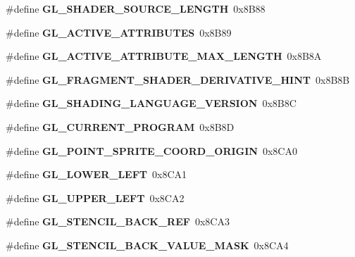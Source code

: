 \begin{DoxyCompactItemize}
\item 
\#define {\bfseries G\+L\+\_\+\+S\+H\+A\+D\+E\+R\+\_\+\+S\+O\+U\+R\+C\+E\+\_\+\+L\+E\+N\+G\+T\+H}~0x8\+B88\label{_s_d_l__opengl_8h_a7b395fbd7051f340da13f8777b24fc5f}

\item 
\#define {\bfseries G\+L\+\_\+\+A\+C\+T\+I\+V\+E\+\_\+\+A\+T\+T\+R\+I\+B\+U\+T\+E\+S}~0x8\+B89\label{_s_d_l__opengl_8h_aa7c727896f0964d71eacb6ccb57ad328}

\item 
\#define {\bfseries G\+L\+\_\+\+A\+C\+T\+I\+V\+E\+\_\+\+A\+T\+T\+R\+I\+B\+U\+T\+E\+\_\+\+M\+A\+X\+\_\+\+L\+E\+N\+G\+T\+H}~0x8\+B8\+A\label{_s_d_l__opengl_8h_ac70225d2da03ecc6671e9e7967fa6f60}

\item 
\#define {\bfseries G\+L\+\_\+\+F\+R\+A\+G\+M\+E\+N\+T\+\_\+\+S\+H\+A\+D\+E\+R\+\_\+\+D\+E\+R\+I\+V\+A\+T\+I\+V\+E\+\_\+\+H\+I\+N\+T}~0x8\+B8\+B\label{_s_d_l__opengl_8h_a8afd2d52d8a440f4b8b05d6284308710}

\item 
\#define {\bfseries G\+L\+\_\+\+S\+H\+A\+D\+I\+N\+G\+\_\+\+L\+A\+N\+G\+U\+A\+G\+E\+\_\+\+V\+E\+R\+S\+I\+O\+N}~0x8\+B8\+C\label{_s_d_l__opengl_8h_acd91f154544ab6a152e97adcb742c891}

\item 
\#define {\bfseries G\+L\+\_\+\+C\+U\+R\+R\+E\+N\+T\+\_\+\+P\+R\+O\+G\+R\+A\+M}~0x8\+B8\+D\label{_s_d_l__opengl_8h_a25774e2f5a5f0edba78f232ea706ffc0}

\item 
\#define {\bfseries G\+L\+\_\+\+P\+O\+I\+N\+T\+\_\+\+S\+P\+R\+I\+T\+E\+\_\+\+C\+O\+O\+R\+D\+\_\+\+O\+R\+I\+G\+I\+N}~0x8\+C\+A0\label{_s_d_l__opengl_8h_af7bfdf67a9b594c8e33ca5cdd5dcfb5d}

\item 
\#define {\bfseries G\+L\+\_\+\+L\+O\+W\+E\+R\+\_\+\+L\+E\+F\+T}~0x8\+C\+A1\label{_s_d_l__opengl_8h_ae8b5c2980cf1e2a2ff8d940b57cdcd1a}

\item 
\#define {\bfseries G\+L\+\_\+\+U\+P\+P\+E\+R\+\_\+\+L\+E\+F\+T}~0x8\+C\+A2\label{_s_d_l__opengl_8h_a7bd958bbbacde2a29bfd74d50e1ddac7}

\item 
\#define {\bfseries G\+L\+\_\+\+S\+T\+E\+N\+C\+I\+L\+\_\+\+B\+A\+C\+K\+\_\+\+R\+E\+F}~0x8\+C\+A3\label{_s_d_l__opengl_8h_a5c9a40aceb53d69be5ffaff15c7d7c3b}

\item 
\#define {\bfseries G\+L\+\_\+\+S\+T\+E\+N\+C\+I\+L\+\_\+\+B\+A\+C\+K\+\_\+\+V\+A\+L\+U\+E\+\_\+\+M\+A\+S\+K}~0x8\+C\+A4\label{_s_d_l__opengl_8h_a7f03d101f47e0c779761cf20b8652dad}


\end{DoxyCompactItemize}
